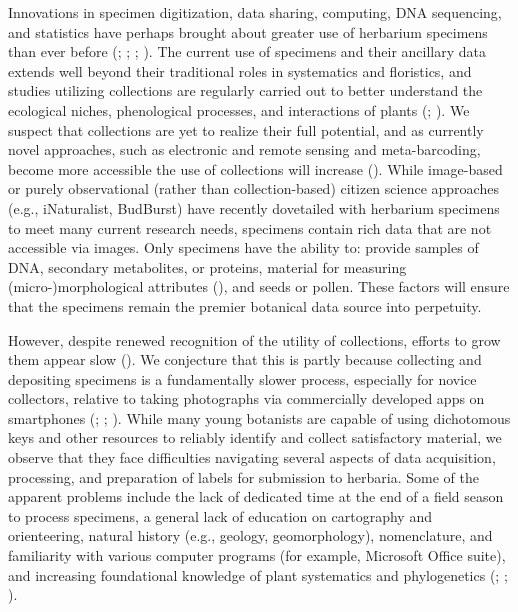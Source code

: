 \documentclass[
]{article}
\begin{document}
Innovations in specimen digitization, data sharing, computing, DNA
sequencing, and statistics have perhaps brought about greater use of
herbarium specimens than ever before
(;
;
;
). The
current use of specimens and their ancillary data extends well beyond
their traditional roles in systematics and floristics, and studies
utilizing collections are regularly carried out to better understand the
ecological niches, phenological processes, and interactions of plants
(;
). We suspect that
collections are yet to realize their full potential, and as currently
novel approaches, such as electronic and remote sensing and
meta-barcoding, become more accessible the use of collections will
increase (). While
image-based or purely observational (rather than collection-based)
citizen science approaches (e.g., iNaturalist, BudBurst) have recently
dovetailed with herbarium specimens to meet many current research needs,
specimens contain rich data that are not accessible via images. Only
specimens have the ability to: provide samples of DNA, secondary
metabolites, or proteins, material for measuring (micro-)morphological
attributes (),
and seeds or pollen. These factors will ensure that the specimens remain
the premier botanical data source into perpetuity.

However, despite renewed recognition of the utility of collections,
efforts to grow them appear slow
(). We conjecture
that this is partly because collecting and depositing specimens is a
fundamentally slower process, especially for novice collectors, relative
to taking photographs via commercially developed apps on smartphones
(;
;
). While many
young botanists are capable of using dichotomous keys and other
resources to reliably identify and collect satisfactory material, we
observe that they face difficulties navigating several aspects of data
acquisition, processing, and preparation of labels for submission to
herbaria. Some of the apparent problems include the lack of dedicated
time at the end of a field season to process specimens, a general lack
of education on cartography and orienteering, natural history (e.g.,
geology, geomorphology), nomenclature, and familiarity with various
computer programs (for example, Microsoft Office suite), and increasing
foundational knowledge of plant systematics and phylogenetics
(;
;
).
\end{document}
